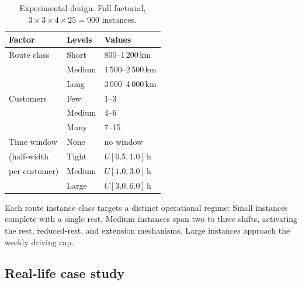 \documentclass[preprint,12pt,3p]{elsarticle}
\begin{document}
\begin{table}[ht]
\centering
\caption{Experimental design. Full factorial,
         $3 \times 3 \times 4 \times 25 = 900$ instances.}
\label{tab:instances}
\small
\begin{tabular}{lll}
\toprule
\textbf{Factor} & \textbf{Levels} & \textbf{Values} \\
\midrule
Route class   & Short  & 800--1\,200\,km     \\
              & Medium & 1\,500--2\,500\,km  \\
              & Long   & 3\,000--4\,000\,km  \\
\midrule
Customers     & Few    & 1--3    \\
              & Medium & 4--6    \\
              & Many   & 7--15   \\
\midrule
Time window   & None   & no window         \\
 (half-width  & Tight  & $U[0.5, 1.0]$\,h  \\
 per customer)& Medium & $U[1.0, 3.0]$\,h  \\
              & Large  & $U[3.0, 6.0]$\,h  \\
\bottomrule
\end{tabular}
\end{table}

Each route instance class targets a distinct operational regime: Small instances complete with a single rest, Medium instances span two to three shifts, activating the rest, reduced-rest, and extension mechanisms. Large instances approach the weekly driving cap.

\subsection{Real-life case study}
\label{sec:casestudy}
\end{document}
